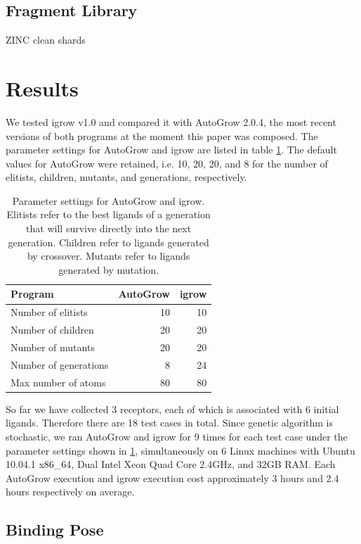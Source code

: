 \documentclass[10pt, conference, compsocconf]{IEEEtran}
\begin{document}
\subsection{Fragment Library}

ZINC clean shards

\section{Results}

We tested igrow v1.0 and compared it with AutoGrow 2.0.4, the most recent versions of both programs at the moment this paper was composed. The parameter settings for AutoGrow and igrow are listed in table \ref{tab:ParameterSettings}. The default values for AutoGrow were retained, i.e. 10, 20, 20, and 8 for the number of elitists, children, mutants, and generations, respectively.

\begin{table}
\centering
\begin{tabular*}
{\linewidth}
{@{\extracolsep{\fill}}lrr}
\noalign{\smallskip}\toprule
Program & AutoGrow & igrow\\
\midrule
\noalign{\smallskip}
Number of elitists & 10 & 10\\
Number of children & 20 & 20\\
Number of mutants & 20 & 20\\
Number of generations & 8 & 24\\
Max number of atoms & 80 & 80\\
\bottomrule
\end{tabular*}
\caption{Parameter settings for AutoGrow and igrow. Elitists refer to the best ligands of a generation that will survive directly into the next generation. Children refer to ligands generated by crossover. Mutants refer to ligands generated by mutation.}
\label{tab:ParameterSettings}
\end{table}

So far we have collected 3 receptors, each of which is associated with 6 initial ligands. Therefore there are 18 test cases in total. Since genetic algorithm is stochastic, we ran AutoGrow and igrow for 9 times for each test case under the parameter settings shown in \ref{tab:ParameterSettings}, simultaneously on 6 Linux machines with Ubuntu 10.04.1 x86\_64, Dual Intel Xeon Quad Core 2.4GHz, and 32GB RAM. Each AutoGrow execution and igrow execution cost approximately 3 hours and 2.4 hours respectively on average.

\subsection{Binding Pose}
\end{document}
